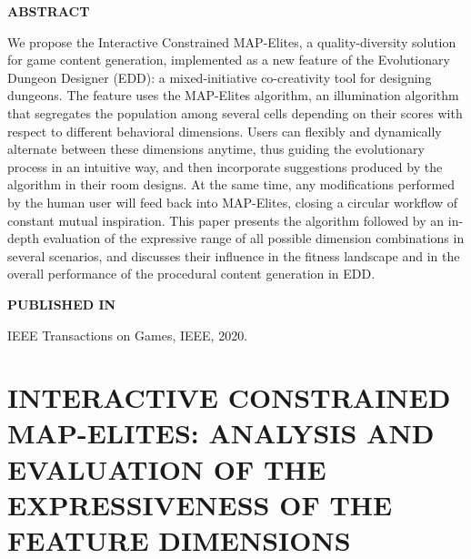 \graphicspath{{included-papers-tex/paper-6/}}



\normalfont
\textbf{\textsc{ABSTRACT}}

We propose the Interactive Constrained MAP-Elites, a quality-diversity solution for game content generation, implemented as a new feature of the Evolutionary Dungeon Designer (EDD): a mixed-initiative co-creativity tool for designing dungeons. The feature uses the MAP-Elites algorithm, an illumination algorithm that segregates the population among several cells depending on their scores with respect to different behavioral dimensions. Users can flexibly and dynamically alternate between these dimensions anytime, thus guiding the evolutionary process in an intuitive way, and then incorporate suggestions produced by the algorithm in their room designs. At the same time, any modifications performed by the human user will feed back into MAP-Elites, closing a circular workflow of constant mutual inspiration. This paper presents the algorithm followed by an in-depth %
evaluation of the expressive range of all possible dimension combinations in several scenarios, %
and discusses their influence in the fitness landscape and in the overall performance of the %
procedural content generation in EDD.

\textbf{\textsc{PUBLISHED IN}}

IEEE Transactions on Games, IEEE, 2020.

\section*{INTERACTIVE CONSTRAINED MAP-ELITES: ANALYSIS AND EVALUATION OF THE EXPRESSIVENESS OF THE FEATURE DIMENSIONS}




% 

% 



